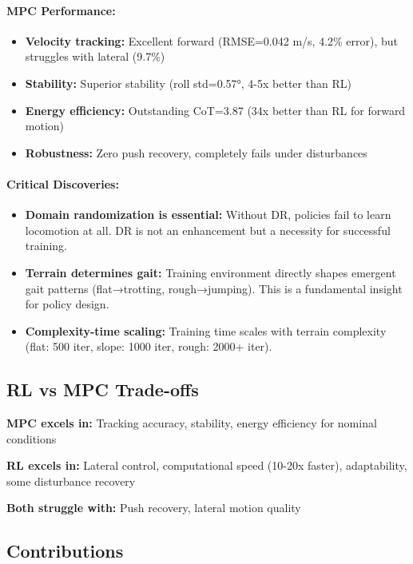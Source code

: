 \documentclass[12pt,a4paper]{article}
\begin{document}
\paragraph{MPC Performance:}
\begin{itemize}
    \item \textbf{Velocity tracking:} Excellent forward (RMSE=0.042 m/s, 4.2\% error), but struggles with lateral (9.7\%)
    \item \textbf{Stability:} Superior stability (roll std=0.57°, 4-5x better than RL)
    \item \textbf{Energy efficiency:} Outstanding CoT=3.87 (34x better than RL for forward motion)
    \item \textbf{Robustness:} Zero push recovery, completely fails under disturbances
\end{itemize}

\paragraph{Critical Discoveries:}
\begin{itemize}
    \item \textbf{Domain randomization is essential:} Without DR, policies fail to learn locomotion at all. DR is not an enhancement but a necessity for successful training.
    \item \textbf{Terrain determines gait:} Training environment directly shapes emergent gait patterns (flat→trotting, rough→jumping). This is a fundamental insight for policy design.
    \item \textbf{Complexity-time scaling:} Training time scales with terrain complexity (flat: 500 iter, slope: 1000 iter, rough: 2000+ iter).
\end{itemize}

\subsection{RL vs MPC Trade-offs}

\textbf{MPC excels in:} Tracking accuracy, stability, energy efficiency for nominal conditions

\textbf{RL excels in:} Lateral control, computational speed (10-20x faster), adaptability, some disturbance recovery

\textbf{Both struggle with:} Push recovery, lateral motion quality

\subsection{Contributions}
\end{document}

